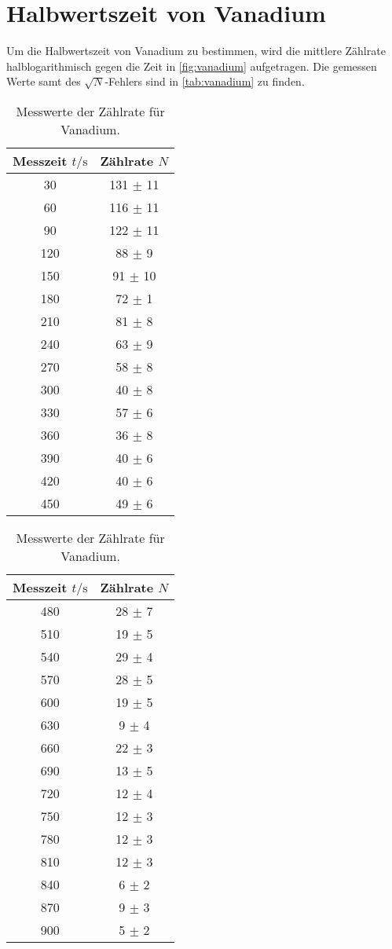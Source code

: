 \section{Halbwertszeit von Vanadium}
\label{sec:Vanadium}
Um die Halbwertszeit von Vanadium zu bestimmen, wird die mittlere Zählrate halblogarithmisch gegen die Zeit
in \autoref{fig:vanadium} aufgetragen. Die gemessen Werte samt des $\sqrt{N}$-Fehlers sind in \autoref{tab:vanadium}
zu finden.
\begin{table}
  \centering
  \begin{tabular}{c c}
    \toprule
    Messzeit $t/\unit{\second}$ & Zählrate $N$\\
    \midrule
     30 & 131 $\pm$ 11 \\
     60 & 116 $\pm$ 11 \\
     90 & 122 $\pm$ 11 \\
    120 &  88 $\pm$  9 \\
    150 &  91 $\pm$ 10 \\
    180 &  72 $\pm$  1 \\
    210 &  81 $\pm$  8 \\
    240 &  63 $\pm$  9 \\
    270 &  58 $\pm$  8 \\
    300 &  40 $\pm$  8 \\
    330 &  57 $\pm$  6 \\
    360 &  36 $\pm$  8 \\
    390 &  40 $\pm$  6 \\
    420 &  40 $\pm$  6 \\
    450 &  49 $\pm$  6 \\
    \bottomrule
  \end{tabular}
  \begin{tabular}{c c}
    \toprule
    Messzeit $t/\unit{\second}$ & Zählrate $N$\\
    \midrule
    480 &  28 $\pm$ 7 \\
    510 &  19 $\pm$ 5 \\
    540 &  29 $\pm$ 4 \\
    570 &  28 $\pm$ 5 \\
    600 &  19 $\pm$ 5 \\
    630 &   9 $\pm$ 4 \\
    660 &  22 $\pm$ 3 \\
    690 &  13 $\pm$ 5 \\
    720 &  12 $\pm$ 4 \\
    750 &  12 $\pm$ 3 \\
    780 &  12 $\pm$ 3 \\
    810 &  12 $\pm$ 3 \\
    840 &   6 $\pm$ 2 \\
    870 &   9 $\pm$ 3 \\
    900 &   5 $\pm$ 2 \\
    \bottomrule
  \end{tabular}
  \caption{Messwerte der Zählrate für Vanadium.}
  \label{tab:vanadium}
\end{table}
